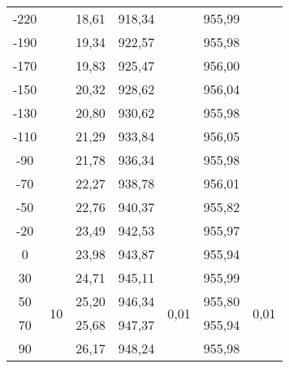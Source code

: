 \documentclass[a4paper,12pt]{report}
\begin{document}
\begin{table}[H]
\begin{tabular}{|c|c|c|c|c|c|c|}
-220   &                      & 18,61 & 918,34 &                        & 955,99  &                        \\ \cline{1-1} \cline{3-4} \cline{6-6}
-190   &                      & 19,34 & 922,57 &                        & 955,98  &                        \\ \cline{1-1} \cline{3-4} \cline{6-6}
-170   &                      & 19,83 & 925,47 &                        & 956,00  &                        \\ \cline{1-1} \cline{3-4} \cline{6-6}
-150   &                      & 20,32 & 928,62 &                        & 956,04  &                        \\ \cline{1-1} \cline{3-4} \cline{6-6}
-130   &                      & 20,80 & 930,62 &                        & 955,98  &                        \\ \cline{1-1} \cline{3-4} \cline{6-6}
-110   &                      & 21,29 & 933,84 &                        & 956,05  &                        \\ \cline{1-1} \cline{3-4} \cline{6-6}
-90    &                      & 21,78 & 936,34 &                        & 955,98  &                        \\ \cline{1-1} \cline{3-4} \cline{6-6}
-70    &                      & 22,27 & 938,78 &                        & 956,01  &                        \\ \cline{1-1} \cline{3-4} \cline{6-6}
-50    &                      & 22,76 & 940,37 &                        & 955,82  &                        \\ \cline{1-1} \cline{3-4} \cline{6-6}
-20    &                      & 23,49 & 942,53 &                        & 955,97  &                        \\ \cline{1-1} \cline{3-4} \cline{6-6}
0      &                      & 23,98 & 943,87 &                        & 955,94  &                        \\ \hline
30     & \multirow{23}{*}{10} & 24,71 & 945,11 & \multirow{23}{*}{0,01} & 955,99  & \multirow{23}{*}{0,01} \\ \cline{1-1} \cline{3-4} \cline{6-6}
50     &                      & 25,20 & 946,34 &                        & 955,80  &                        \\ \cline{1-1} \cline{3-4} \cline{6-6}
70     &                      & 25,68 & 947,37 &                        & 955,94  &                        \\ \cline{1-1} \cline{3-4} \cline{6-6}
90     &                      & 26,17 & 948,24 &                        & 955,98  &                        \\ \cline{1-1} \cline{3-4} \cline{6-6}

\end{tabular}
\end{table}
\end{document}
